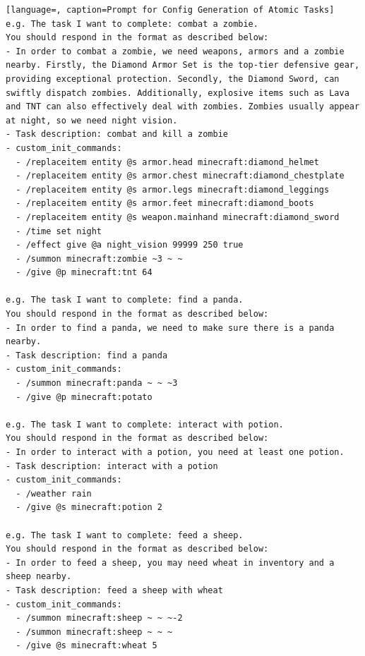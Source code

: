 \begin{lstlisting}[language=, caption=Prompt for Config Generation of Atomic Tasks]
e.g. The task I want to complete: combat a zombie.
You should respond in the format as described below:
- In order to combat a zombie, we need weapons, armors and a zombie nearby. Firstly, the Diamond Armor Set is the top-tier defensive gear, providing exceptional protection. Secondly, the Diamond Sword, can swiftly dispatch zombies. Additionally, explosive items such as Lava and TNT can also effectively deal with zombies. Zombies usually appear at night, so we need night vision.
- Task description: combat and kill a zombie
- custom_init_commands:
  - /replaceitem entity @s armor.head minecraft:diamond_helmet
  - /replaceitem entity @s armor.chest minecraft:diamond_chestplate
  - /replaceitem entity @s armor.legs minecraft:diamond_leggings
  - /replaceitem entity @s armor.feet minecraft:diamond_boots
  - /replaceitem entity @s weapon.mainhand minecraft:diamond_sword
  - /time set night
  - /effect give @a night_vision 99999 250 true
  - /summon minecraft:zombie ~3 ~ ~
  - /give @p minecraft:tnt 64

e.g. The task I want to complete: find a panda.
You should respond in the format as described below:
- In order to find a panda, we need to make sure there is a panda nearby.
- Task description: find a panda
- custom_init_commands:
  - /summon minecraft:panda ~ ~ ~3
  - /give @p minecraft:potato

e.g. The task I want to complete: interact with potion.
You should respond in the format as described below:
- In order to interact with a potion, you need at least one potion.
- Task description: interact with a potion
- custom_init_commands:
  - /weather rain
  - /give @s minecraft:potion 2

e.g. The task I want to complete: feed a sheep.
You should respond in the format as described below:
- In order to feed a sheep, you may need wheat in inventory and a sheep nearby.
- Task description: feed a sheep with wheat
- custom_init_commands:
  - /summon minecraft:sheep ~ ~ ~-2
  - /summon minecraft:sheep ~ ~ ~
  - /give @s minecraft:wheat 5


\end{lstlisting}
